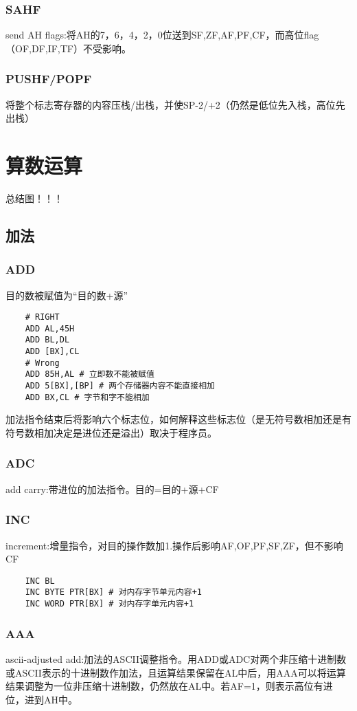 \subsubsection{SAHF}
send AH flags:将AH的7，6，4，2，0位送到SF,ZF,AF,PF,CF，而高位flag（OF,DF,IF,TF）不受影响。
\subsubsection{PUSHF/POPF}
将整个标志寄存器的内容压栈/出栈，并使SP-2/+2（仍然是低位先入栈，高位先出栈）
\section{算数运算}
总结图！！！
\subsection{加法}
\subsubsection{ADD}
目的数被赋值为“目的数+源”
\begin{lstlisting}
    # RIGHT
    ADD AL,45H
    ADD BL,DL 
    ADD [BX],CL
    # Wrong
    ADD 85H,AL # 立即数不能被赋值
    ADD 5[BX],[BP] # 两个存储器内容不能直接相加
    ADD BX,CL # 字节和字不能相加
\end{lstlisting}
加法指令结束后将影响六个标志位，如何解释这些标志位（是无符号数相加还是有符号数相加决定是进位还是溢出）取决于程序员。
\subsubsection{ADC}
add carry:带进位的加法指令。目的=目的+源+CF
\subsubsection{INC}
increment:增量指令，对目的操作数加1.操作后影响AF,OF,PF,SF,ZF，但不影响CF
\begin{lstlisting}
    INC BL 
    INC BYTE PTR[BX] # 对内存字节单元内容+1
    INC WORD PTR[BX] # 对内存字单元内容+1
\end{lstlisting}
\subsubsection{AAA}
ascii-adjusted add:加法的ASCII调整指令。用ADD或ADC对两个非压缩十进制数或ASCII表示的十进制数作加法，且运算结果保留在AL中后，用AAA可以将运算结果调整为一位非压缩十进制数，仍然放在AL中。若AF=1，则表示高位有进位，进到AH中。

